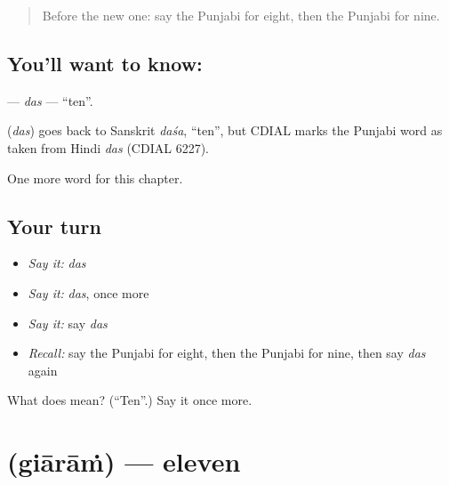 \label{lesson:PA-C95-das}



\begin{quote}
Before the new one: say the Punjabi for eight, then the Punjabi for nine.
\end{quote}

\subsection*{You'll want to know: }
\textbf{} — \emph{das} — \textquotedblleft{}ten\textquotedblright{}.

\begin{cousinweb}
\textbf{} (\emph{das}) goes back to Sanskrit \emph{daśa}, \textquotedblleft{}ten\textquotedblright{}, but CDIAL marks the Punjabi word as taken from Hindi \emph{das} (CDIAL 6227).
\end{cousinweb}

\begin{grammarlens}[title={What you've built}]
One more word for this chapter.
\end{grammarlens}

\subsection*{Your turn}
\begin{itemize}
\raggedright
  \item \emph{Say it:} \emph{das}
  \item \emph{Say it:} \emph{das}, once more
  \item \emph{Say it:} say \emph{das}
  \item \emph{Recall:} say the Punjabi for eight, then the Punjabi for nine, then say \emph{das} again
\end{itemize}

\begin{tcolorbox}[breakable,colback=teal!4,colframe=teal!35!black,title={Before you move on}]
What does  mean? (\textquotedblleft{}Ten\textquotedblright{}.) Say it once more.
\end{tcolorbox}
\section[\texorpdfstring{\pa{ਗਿਆਰਾਂ} (giārāṁ)}{ਗਿਆਰਾਂ (giārāṁ)}]{ (giārāṁ) — eleven}

\label{lesson:PA-C95-giaram}



